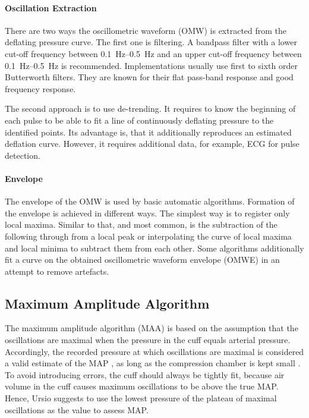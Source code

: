 \paragraph{Oscillation Extraction} There are two ways the oscillometric waveform (OMW) is extracted from the deflating pressure curve. The first one is filtering. A  bandpass filter with a lower cut-off frequency between \SIrange{0.1}{0.5}{\Hz} and an upper cut-off frequency between \SIrange{0.1}{0.5}{\Hz} is recommended. \cite{Forouzanfar2015} Implementations usually use first \cite{Lim2015} to sixth order \cite{Jazbinsek2010} Butterworth filters. They are known for their flat pass-band response and good frequency response.

The second approach is to use de-trending. It requires to know the beginning of each pulse to be able to fit a line of continuously deflating pressure to the identified points. Its advantage is, that it additionally reproduces an estimated deflation curve. However, it requires additional data, for example, ECG for pulse detection.\cite{Forouzanfar2015}

\paragraph{Envelope} The envelope of the OMW is used by basic automatic algorithms. Formation of the envelope is achieved in different ways. The simplest way is to register only local maxima. Similar to that, and most common, is the subtraction of the following through from a local peak or interpolating the curve of local maxima and local minima to subtract them from each other. Some algorithms additionally fit a curve on the obtained oscillometric waveform envelope (OMWE) in an attempt to remove artefacts. \cite{Forouzanfar2014}


\subsection{Maximum Amplitude Algorithm}
The maximum amplitude algorithm (MAA) is based on the assumption that the oscillations are maximal when the pressure in the cuff equals arterial pressure. Accordingly, the recorded pressure at which oscillations are maximal is considered a valid estimate of the MAP \cite{Babbs2012,Geddes1982,Drzewiecki1994}\cite{Ramsey1979}, as long as the compression chamber is kept small \cite{Mauck1980}. To avoid introducing errors, the cuff should always be tightly fit, because air volume in the cuff causes maximum oscillations to be above the true MAP. Hence, Ursio suggests to use the lowest pressure of the plateau of maximal oscillations as the value to assess MAP.\cite{Ursino1996}


